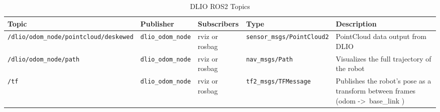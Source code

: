 \documentclass[english, bachelor, utf8]{base/thesis_telematics}
\begin{document}
\begin{table}[H]
\centering
\caption{DLIO ROS2 Topics}
\label{tab:dlio_topics}
\scriptsize  %
\begin{tabularx}{\textwidth}{@{}llXlX@{}}
\toprule
\textbf{Topic} & \textbf{Publisher} & \textbf{Subscribers} & \textbf{Type} & \textbf{Description} \\
\midrule
\texttt{/dlio/odom\_node/pointcloud/deskewed} & \texttt{dlio\_odom\_node} & rviz or rosbag & \texttt{sensor\_msgs/PointCloud2} & PointCloud data output from DLIO \\[0.3em]
\texttt{/dlio/odom\_node/path} & \texttt{dlio\_odom\_node} & rviz or rosbag & \texttt{nav\_msgs/Path} & Visualizes the full trajectory of the robot \\
\texttt{/tf} & \texttt{dlio\_odom\_node} & rviz or rosbag & \texttt{tf2\_msgs/TFMessage} & Publishes the robot’s pose as a transform between frames (odom -\textgreater~base\_link ) \\

\bottomrule
\end{tabularx}
\end{table}
\end{document}

